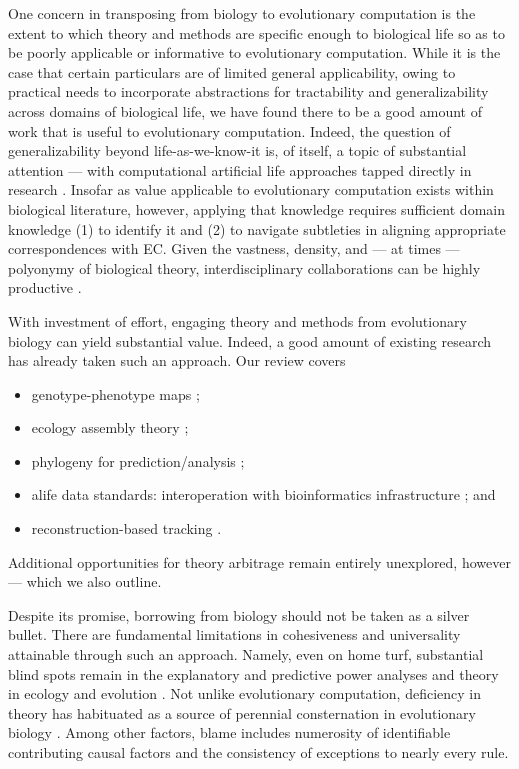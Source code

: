 One concern in transposing from biology to evolutionary computation is the extent to which theory and methods are specific enough to biological life so as to be poorly applicable or informative to evolutionary computation.
While it is the case that certain particulars are of limited general applicability, owing to practical needs to incorporate abstractions for tractability and generalizability across domains of biological life, we have found there to be a good amount of work that is useful to evolutionary computation.
Indeed, the question of generalizability beyond life-as-we-know-it is, of itself, a topic of substantial attention --- with computational artificial life approaches tapped directly in research \citep{cleland2013general}.
Insofar as value applicable to evolutionary computation exists within biological literature, however, applying that knowledge requires sufficient domain knowledge (1) to identify it and (2) to navigate subtleties in aligning appropriate correspondences with EC.
Given the vastness, density, and --- at times --- polyonymy of biological theory, interdisciplinary collaborations can be highly productive \citep{goodman2020evolution}.

With investment of effort, engaging theory and methods from evolutionary biology can yield substantial value.
Indeed, a good amount of existing research has already taken such an approach.
Our review covers
\begin{itemize}
  \item genotype-phenotype maps \citep{TODO};
  \item ecology assembly theory \citep{dolson2024reachability};
  \item phylogeny for prediction/analysis \citep{hernandez2022can,shahbandegan2022untangling};
  \item alife data standards: interoperation with bioinformatics infrastructure \citep{lalejini2019data,moreno2024apc}; and
  \item reconstruction-based tracking \citep{moreno2022hstrat,moreno2024ecology}.
\end{itemize}
Additional opportunities for theory arbitrage remain entirely unexplored, however --- which we also outline.

Despite its promise, borrowing from biology should not be taken as a silver bullet.
There are fundamental limitations in cohesiveness and universality attainable through such an approach.
Namely, even on home turf, substantial blind spots remain in the explanatory and predictive power analyses and theory in ecology and evolution \citep{TODO}.
Not unlike evolutionary computation, deficiency in theory has habituated as a source of perennial consternation in evolutionary biology \citep{welch2017wrong}.
Among other factors, blame includes numerosity of identifiable contributing causal factors and the consistency of exceptions to nearly every rule.


